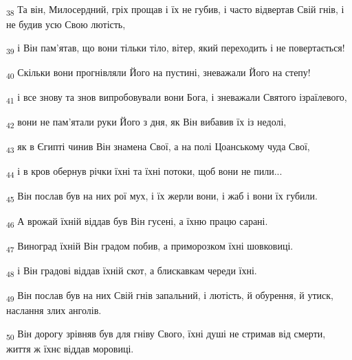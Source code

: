 \begin{tcolorbox}
\textsubscript{38} Та він, Милосердний, гріх прощав і їх не губив, і часто відвертав Свій гнів, і не будив усю Свою лютість,
\end{tcolorbox}
\begin{tcolorbox}
\textsubscript{39} і Він пам'ятав, що вони тільки тіло, вітер, який переходить і не повертається!
\end{tcolorbox}
\begin{tcolorbox}
\textsubscript{40} Скільки вони прогнівляли Його на пустині, зневажали Його на степу!
\end{tcolorbox}
\begin{tcolorbox}
\textsubscript{41} і все знову та знов випробовували вони Бога, і зневажали Святого ізраїлевого,
\end{tcolorbox}
\begin{tcolorbox}
\textsubscript{42} вони не пам'ятали руки Його з дня, як Він вибавив їх із недолі,
\end{tcolorbox}
\begin{tcolorbox}
\textsubscript{43} як в Єгипті чинив Він знамена Свої, а на полі Цоанському чуда Свої,
\end{tcolorbox}
\begin{tcolorbox}
\textsubscript{44} і в кров обернув річки їхні та їхні потоки, щоб вони не пили...
\end{tcolorbox}
\begin{tcolorbox}
\textsubscript{45} Він послав був на них рої мух, і їх жерли вони, і жаб і вони їх губили.
\end{tcolorbox}
\begin{tcolorbox}
\textsubscript{46} А врожай їхній віддав був Він гусені, а їхню працю сарані.
\end{tcolorbox}
\begin{tcolorbox}
\textsubscript{47} Виноград їхній Він градом побив, а приморозком їхні шовковиці.
\end{tcolorbox}
\begin{tcolorbox}
\textsubscript{48} і Він градові віддав їхній скот, а блискавкам череди їхні.
\end{tcolorbox}
\begin{tcolorbox}
\textsubscript{49} Він послав був на них Свій гнів запальний, і лютість, й обурення, й утиск, наслання злих анголів.
\end{tcolorbox}
\begin{tcolorbox}
\textsubscript{50} Він дорогу зрівняв був для гніву Свого, їхні душі не стримав від смерти, життя ж їхнє віддав моровиці.
\end{tcolorbox}
